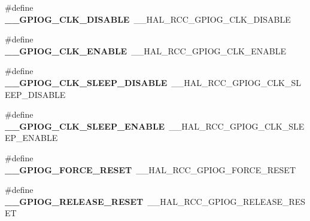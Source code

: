 \begin{DoxyCompactItemize}
\item 
\hypertarget{group___h_a_l___r_c_c___aliased_ga92dbcb4535f920a5491868e11679317d}{\#define {\bfseries \-\_\-\-\_\-\-G\-P\-I\-O\-G\-\_\-\-C\-L\-K\-\_\-\-D\-I\-S\-A\-B\-L\-E}~\-\_\-\-\_\-\-H\-A\-L\-\_\-\-R\-C\-C\-\_\-\-G\-P\-I\-O\-G\-\_\-\-C\-L\-K\-\_\-\-D\-I\-S\-A\-B\-L\-E}\label{group___h_a_l___r_c_c___aliased_ga92dbcb4535f920a5491868e11679317d}

\item 
\hypertarget{group___h_a_l___r_c_c___aliased_gae2ca1f890479936f0af6c7babf081333}{\#define {\bfseries \-\_\-\-\_\-\-G\-P\-I\-O\-G\-\_\-\-C\-L\-K\-\_\-\-E\-N\-A\-B\-L\-E}~\-\_\-\-\_\-\-H\-A\-L\-\_\-\-R\-C\-C\-\_\-\-G\-P\-I\-O\-G\-\_\-\-C\-L\-K\-\_\-\-E\-N\-A\-B\-L\-E}\label{group___h_a_l___r_c_c___aliased_gae2ca1f890479936f0af6c7babf081333}

\item 
\hypertarget{group___h_a_l___r_c_c___aliased_gacf397da76245acbf054ecef32284bdfc}{\#define {\bfseries \-\_\-\-\_\-\-G\-P\-I\-O\-G\-\_\-\-C\-L\-K\-\_\-\-S\-L\-E\-E\-P\-\_\-\-D\-I\-S\-A\-B\-L\-E}~\-\_\-\-\_\-\-H\-A\-L\-\_\-\-R\-C\-C\-\_\-\-G\-P\-I\-O\-G\-\_\-\-C\-L\-K\-\_\-\-S\-L\-E\-E\-P\-\_\-\-D\-I\-S\-A\-B\-L\-E}\label{group___h_a_l___r_c_c___aliased_gacf397da76245acbf054ecef32284bdfc}

\item 
\hypertarget{group___h_a_l___r_c_c___aliased_gab096e874f34cac1a17f8304b352145fb}{\#define {\bfseries \-\_\-\-\_\-\-G\-P\-I\-O\-G\-\_\-\-C\-L\-K\-\_\-\-S\-L\-E\-E\-P\-\_\-\-E\-N\-A\-B\-L\-E}~\-\_\-\-\_\-\-H\-A\-L\-\_\-\-R\-C\-C\-\_\-\-G\-P\-I\-O\-G\-\_\-\-C\-L\-K\-\_\-\-S\-L\-E\-E\-P\-\_\-\-E\-N\-A\-B\-L\-E}\label{group___h_a_l___r_c_c___aliased_gab096e874f34cac1a17f8304b352145fb}

\item 
\hypertarget{group___h_a_l___r_c_c___aliased_ga57b6cddde29aedce9ebf483960f1791b}{\#define {\bfseries \-\_\-\-\_\-\-G\-P\-I\-O\-G\-\_\-\-F\-O\-R\-C\-E\-\_\-\-R\-E\-S\-E\-T}~\-\_\-\-\_\-\-H\-A\-L\-\_\-\-R\-C\-C\-\_\-\-G\-P\-I\-O\-G\-\_\-\-F\-O\-R\-C\-E\-\_\-\-R\-E\-S\-E\-T}\label{group___h_a_l___r_c_c___aliased_ga57b6cddde29aedce9ebf483960f1791b}

\item 
\hypertarget{group___h_a_l___r_c_c___aliased_ga832664434143cecc9b9596da4dbf0b2f}{\#define {\bfseries \-\_\-\-\_\-\-G\-P\-I\-O\-G\-\_\-\-R\-E\-L\-E\-A\-S\-E\-\_\-\-R\-E\-S\-E\-T}~\-\_\-\-\_\-\-H\-A\-L\-\_\-\-R\-C\-C\-\_\-\-G\-P\-I\-O\-G\-\_\-\-R\-E\-L\-E\-A\-S\-E\-\_\-\-R\-E\-S\-E\-T}\label{group___h_a_l___r_c_c___aliased_ga832664434143cecc9b9596da4dbf0b2f}


\end{DoxyCompactItemize}
